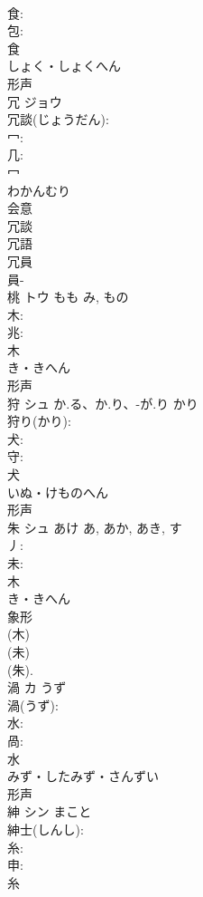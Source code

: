 \documentclass[8pt]{extreport}
\begin{document}
\begin{CJK}{UTF8}{min}
\\	食: 
\\	包: 
\\	食	
\\	しょく・しょくへん	
\\	形声 
\\	冗	ジョウ			
\\	冗談(じょうだん): 
\\	冖: 
\\	几: 
\\	冖	
\\	わかんむり	
\\	会意 
\\	冗談 
\\	冗語 
\\	冗員 
\\	員-
\\	桃	トウ	もも	み, もの	
\\	木: 
\\	兆: 
\\	木	
\\	き・きへん	
\\	形声 
\\	狩	シュ	か.る、か.り、-が.り	かり	
\\	狩り(かり): 
\\	犬: 
\\	守: 
\\	犬	
\\	いぬ・けものへん	
\\	形声 
\\	朱	シュ	あけ	あ, あか, あき, す	
\\	丿: 
\\	未: 
\\	木	
\\	き・きへん	
\\	象形 
\\	(木) 
\\	(未)
\\	(朱).
\\	渦	カ	うず		
\\	渦(うず): 
\\	水: 
\\	咼: 
\\	水	
\\	みず・したみず・さんずい	
\\	形声 
\\	紳	シン		まこと	
\\	紳士(しんし): 
\\	糸: 
\\	申: 
\\	糸	

\end{CJK}
\end{document}
